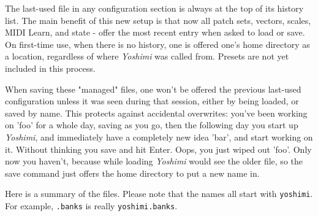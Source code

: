    The last-used file in any configuration section is always at the top of its
   history list.  The main benefit of this new setup is that now all patch
   sets, vectors, scales, MIDI Learn, and state - offer the most recent entry
   when asked to load or save. On first-time use, when there is no history, one
   is offered one's home directory as a location, regardless of where
   \textsl{Yoshimi} was called from.  Presets are not yet included in this
   process.

   When saving these "managed" files, one won't be offered the previous
   last-used configuration unless it was seen during that session, either by
   being loaded, or saved by name.  This protects against accidental
   overwrites: you've been working on 'foo' for a whole day, saving as you go,
   then the following day you start up \textsl{Yoshimi}, and immediately have
   a completely new idea 'bar', and start working on it. Without thinking you
   save and hit Enter. Oops, you just wiped out 'foo'. Only now you haven't,
   because while loading \textsl{Yoshimi} would see the older file, so the
   save command just offers the home directory to put a new name in.

   Here is a summary of the files.  Please note that the names all start with
   \texttt{yoshimi}.  For example, \texttt{.banks} is really
   \texttt{yoshimi.banks}.

